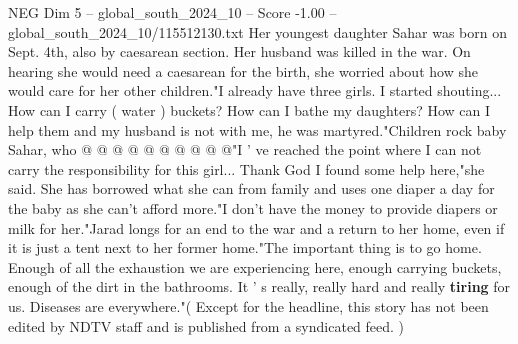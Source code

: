 \begin{textsample}{NEG Dim 5 – global\_south\_2024\_10 – Score -1.00 – global\_south\_2024\_10/115512130.txt}
Her youngest daughter Sahar was born on Sept. 4th, also by caesarean section.
Her husband was killed in the war.
On hearing she would need a caesarean for the birth, she worried about how she would care for her other children."I already have three girls.
I started shouting...
How can I carry ( water ) buckets?
How can I bathe my daughters?
How can I help them and my husband is not with me, he was martyred."Children rock baby Sahar, who @ @ @ @ @ @ @ @ @ @"I ' ve reached the point where I can not carry the responsibility for this girl...
Thank God I found some help here,"she said.
She has borrowed what she can from family and uses one diaper a day for the baby as she can't afford more."I don't have the money to provide diapers or milk for her."Jarad longs for an end to the war and a return to her home, even if it is just a tent next to her former home."The important thing is to go home.
Enough of all the exhaustion we are experiencing here, enough carrying buckets, enough of the dirt in the bathrooms.
It ' s really, really hard and really \textbf{tiring} for us.
Diseases are everywhere."( Except for the headline, this story has not been edited by NDTV staff and is published from a syndicated feed. )

\end{textsample}
